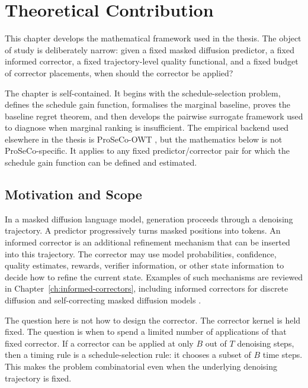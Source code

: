 \chapter{Theoretical Contribution}
\label{ch:contribution}

This chapter develops the mathematical framework used in the thesis. The object
of study is deliberately narrow: given a fixed masked diffusion predictor, a
fixed informed corrector, a fixed trajectory-level quality functional, and a
fixed budget of corrector placements, when should the corrector be applied?

The chapter is self-contained. It begins with the schedule-selection problem,
defines the schedule gain function, formalises the marginal baseline, proves
the baseline regret theorem, and then develops the pairwise surrogate framework
used to diagnose when marginal ranking is insufficient. The empirical backend
used elsewhere in the thesis is ProSeCo-OWT \parencite{schiff2026proseco}, but
the mathematics below is not ProSeCo-specific. It applies to any fixed
predictor/corrector pair for which the schedule gain function can be defined
and estimated.

\section{Motivation and Scope}
\label{sec:ch6-motivation}

In a masked diffusion language model, generation proceeds through a denoising
trajectory. A predictor progressively turns masked positions into tokens.
An informed corrector is an additional refinement mechanism that can be
inserted into this trajectory. The corrector may use model probabilities,
confidence, quality estimates, rewards, verifier information, or other state
information to decide how to refine the current state. Examples of such
mechanisms are reviewed in Chapter~\ref{ch:informed-correctors}, including
informed correctors for discrete diffusion \parencite{zhao2024informedcorrectors}
and self-correcting masked diffusion models \parencite{schiff2026proseco}.

The question here is not how to design the corrector. The corrector kernel is
held fixed. The question is when to spend a limited number of applications of
that fixed corrector. If a corrector can be applied at only $B$ out of $T$
denoising steps, then a timing rule is a schedule-selection rule: it chooses a
subset of $B$ time steps. This makes the problem combinatorial even when the
underlying denoising trajectory is fixed.

